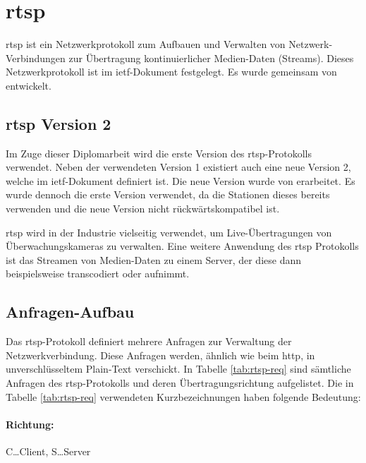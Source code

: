 \section{\acl{rtsp}}
\acs{rtsp} ist ein Netzwerkprotokoll zum Aufbauen und Verwalten von Netzwerk-Verbindungen zur Übertragung kontinuierlicher Medien-Daten (Streams).
Dieses Netzwerkprotokoll ist im \acs{ietf}-Dokument  festgelegt. 
Es wurde gemeinsam von \citeauthor{ietf-rtsp} entwickelt. \cite[vgl.][]{ietf-rtsp}\par

\subsection{\acs{rtsp} Version 2}
Im Zuge dieser Diplomarbeit wird die erste Version des \acs{rtsp}-Protokolls verwendet.
Neben der verwendeten Version 1 existiert auch eine neue Version 2, welche im \acs{ietf}-Dokument  definiert ist. Die neue Version wurde von \citeauthor{ietf-rtsp-2} erarbeitet. \cite[vgl.][]{ietf-rtsp-2}
Es wurde dennoch die erste Version verwendet, da die Stationen dieses bereits verwenden und die neue Version nicht rückwärtskompatibel ist.\par

\acs{rtsp} wird in der Industrie vielseitig verwendet, um Live-Übertragungen von Überwachungskameras zu verwalten. Eine weitere Anwendung des \acs{rtsp} Protokolls ist das Streamen von Medien-Daten zu einem Server, der diese dann beispielsweise transcodiert oder aufnimmt.

\subsection{Anfragen-Aufbau}
Das \acs{rtsp}-Protokoll definiert mehrere Anfragen zur Verwaltung der Netzwerkverbindung.
Diese Anfragen werden, ähnlich wie beim \acs{http}, in unverschlüsseltem Plain-Text verschickt.
In Tabelle \ref{tab:rtsp-req} sind sämtliche Anfragen des \acs{rtsp}-Protokolls und deren Übertragungsrichtung aufgelistet.
Die in Tabelle \ref{tab:rtsp-req} verwendeten Kurzbezeichnungen haben folgende Bedeutung:
\paragraph{Richtung:} C\dots Client, S\dots Server
